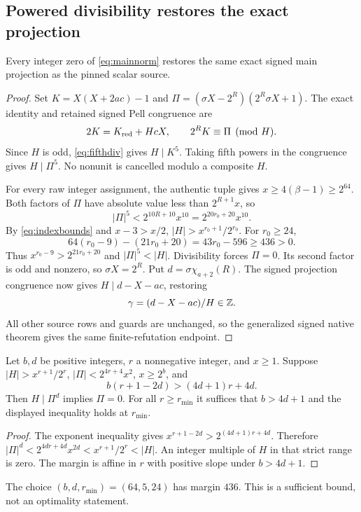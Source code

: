 \subsection{Powered divisibility restores the exact projection}
\begin{theorem}\label{thm:saturation}
Every integer zero of \eqref{eq:mainnorm} restores the same exact signed main projection as the pinned scalar source.
\end{theorem}
\begin{proof}
Set $K=X(X+2ac)-1$ and $\Pi=(\sigma X-2^R)(2^R\sigma X+1)$. The exact identity and retained signed Pell congruence are
\begin{equation}\label{eq:unitcong}
 2K=K_{\mathrm{red}}+HcX,\qquad 2^RK\equiv\Pi\pmod H.
\end{equation}
Since $H$ is odd, \eqref{eq:fifthdiv} gives $H\mid K^5$. Taking fifth powers in the congruence gives $H\mid\Pi^5$. No nonunit is cancelled modulo a composite $H$.

For every raw integer assignment, the authentic tuple gives $x\ge4(\beta-1)\ge2^{64}$. Both factors of $\Pi$ have absolute value less than $2^{R+1}x$, so
\[
 |\Pi|^5<2^{10R+10}x^{10}=2^{20r_0+20}x^{10}.
\]
By \eqref{eq:indexbounds} and $x-3>x/2$, $|H|>x^{r_0+1}/2^{r_0}$. For $r_0\ge24$,
\[
 64(r_0-9)-(21r_0+20)=43r_0-596\ge436>0.
\]
Thus $x^{r_0-9}>2^{21r_0+20}$ and $|\Pi|^5<|H|$. Divisibility forces $\Pi=0$. Its second factor is odd and nonzero, so $\sigma X=2^R$. Put $d=\sigma\chi_{a+2}(R)$. The signed projection congruence now gives $H\mid d-X-ac$, restoring
\[
 \gamma=(d-X-ac)/H\in\mathbb Z.
\]
All other source rows and guards are unchanged, so the generalized signed native theorem gives the same finite-refutation endpoint.
\end{proof}

\begin{lemma}
Let $b,d$ be positive integers, $r$ a nonnegative integer, and $x\ge1$. Suppose $|H|>x^{r+1}/2^r$, $|\Pi|<2^{4r+4}x^2$, $x\ge2^b$, and
\[
 b(r+1-2d)>(4d+1)r+4d.
\]
Then $H\mid\Pi^d$ implies $\Pi=0$. For all $r\ge r_{\min}$ it suffices that $b>4d+1$ and the displayed inequality holds at $r_{\min}$.
\end{lemma}
\begin{proof}
The exponent inequality gives $x^{r+1-2d}>2^{(4d+1)r+4d}$. Therefore $|\Pi|^d<2^{4dr+4d}x^{2d}<x^{r+1}/2^r<|H|$. An integer multiple of $H$ in that strict range is zero. The margin is affine in $r$ with positive slope under $b>4d+1$.
\end{proof}
The choice $(b,d,r_{\min})=(64,5,24)$ has margin $436$. This is a sufficient bound, not an optimality statement.

